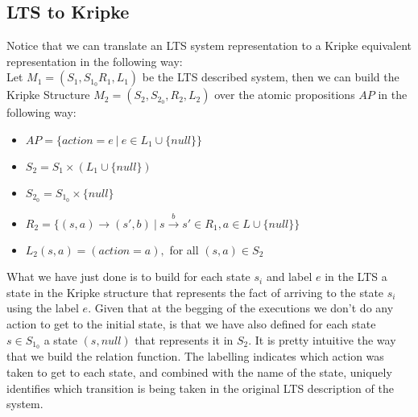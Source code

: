 \documentclass[12pt]{llncs2e/llncs}
\begin{document}
\subsection{LTS to Kripke}\label{lts2kripke}
Notice that we can translate an LTS system representation to a Kripke equivalent representation in the following way:\\

Let $M_1 = (S_1, S_{1_0} R_1, L_1)$ be the LTS described system, then we can build the Kripke Structure $M_2 = (S_2,S_{2_0},R_2,L_2)$ over the atomic propositions $AP$ in the following way:
\begin{itemize}
\item $ AP = \{action = e ~|~ e \in L_1 \cup \{null\}\} $
\item $ S_2 = S_1 \times (L_1 \cup \{null\}) $
\item $S_{2_0} = S_{1_0} \times \{null\}$
\item $R_2 = \{(s,a) \rightarrow (s',b) ~|~ s\overset{b}{\rightarrow}s' \in R_1, a \in L \cup \{null\}\}$
\item $L_2(s,a) = (action = a),$ for all $(s,a) \in S_2$
\end{itemize}
What we have just done is to build for each state $s_i$ and label $e$ in the LTS a state in the Kripke structure that represents the fact of arriving to the state $s_i$ using the label $e$. Given that at the begging of the executions we don't do any action to get to the initial state, is that we have also defined for each state $s \in S_{1_0}$ a state $(s,null)$ that represents it in $S_2$. It is pretty intuitive the way that we build the relation function. The labelling indicates which action was taken to get to each state, and combined with the name of the state, uniquely identifies which transition is being taken in the original LTS description of the system.
\end{document}
